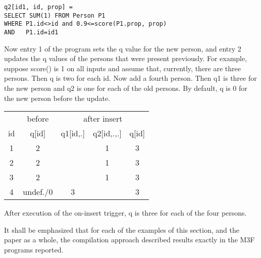 \begin{example}
\begin{verbatim}
q2[id1, id, prop] =
SELECT SUM(1) FROM Person P1
WHERE P1.id<>id and 0.9<=score(P1.prop, prop)
AND   P1.id=id1 
\end{verbatim}

Now entry 1 of the program sets the q value for the new person, and
entry 2 updates the q values of the persons that were present previously.
For example, suppose score() is 1 on all inputs and assume that, currently,
there are three persons. Then q is two for each id. Now add a fourth person.
Then q1 is three for the new person and q2 is one for each of the old persons.
By default, q is 0 for the new person before the update.
%
\begin{center}
\begin{tabular}{c|c|c|c|c}
   & before    & \multicolumn{3}{c}{after insert} \\
id & q[id]     & q1[id,.] & q2[id,.,.] & q[id] \\
\hline
1  & 2         &          & 1          & 3 \\
2  & 2         &          & 1          & 3 \\
3  & 2         &          & 1          & 3 \\
4  & undef./0  & 3        &            & 3 \\
\end{tabular}
\end{center}
%
After execution of the on-insert trigger, q is three for each of the four
persons.
\punto
\end{example}


It shall be emphasized that for each of the examples of this section,
and the paper as a whole, the compilation approach described results exactly
in the M3F programs reported.


